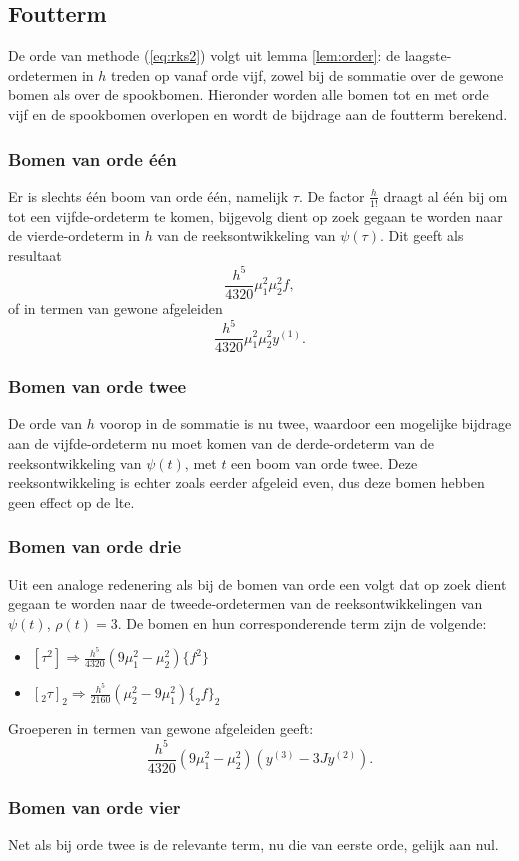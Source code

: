 \documentclass[12pt]{article}
\begin{document}
\subsection{Foutterm}
De orde van methode (\ref{eq:rks2}) volgt uit lemma \ref{lem:order}: de laagste-ordetermen in \(h\) treden op vanaf orde vijf, zowel bij de sommatie over de gewone bomen als over de spookbomen. Hieronder worden alle bomen tot en met orde vijf en de spookbomen overlopen en wordt de bijdrage aan de foutterm berekend.

\subsubsection{Bomen van orde één}
Er is slechts één boom van orde één, namelijk \(\tau\). De factor \(\frac{h}{1!}\) draagt al één bij om tot een vijfde-ordeterm te komen, bijgevolg dient op zoek gegaan te worden naar de vierde-ordeterm in \(h\) van de reeksontwikkeling van \(\psi(\tau)\). Dit geeft als resultaat
\[\frac{h^5}{4320}\mu_1^2\mu_2^2f,\]
of in termen van gewone afgeleiden
\[\frac{h^5}{4320}\mu_1^2\mu_2^2y^{(1)}.\]
\subsubsection{Bomen van orde twee}
De orde van \(h\) voorop in de sommatie is nu twee, waardoor een mogelijke bijdrage aan de vijfde-ordeterm nu moet komen van de derde-ordeterm van de reeksontwikkeling van \(\psi(t)\), met \(t\) een boom van orde twee. Deze reeksontwikkeling is echter zoals eerder afgeleid even, dus deze bomen hebben geen effect op de lte.
\subsubsection{Bomen van orde drie}
Uit een analoge redenering als bij de bomen van orde een volgt dat op zoek dient gegaan te worden naar de tweede-ordetermen van de reeksontwikkelingen van \(\psi(t)\), \(\rho(t)=3\). De bomen en hun corresponderende term zijn de volgende: 
\begin{itemize}
    \item \([\tau^2]\Rightarrow\frac{h^5}{4320}\left(9\mu_1^2-\mu_2^2\right)\{f^2\}\)
    \item \([_2\tau]_2\Rightarrow\frac{h^5}{2160}\left(\mu_2^2-9\mu_1^2\right)\{_2f\}_2\)
\end{itemize}
Groeperen in termen van gewone afgeleiden geeft:
\[\frac{h^5}{4320}(9\mu_1^2-\mu_2^2)(y^{(3)}-3Jy^{(2)}).\]
\subsubsection{Bomen van orde vier}
Net als bij orde twee is de relevante term, nu die van eerste orde, gelijk aan nul.
\end{document}
